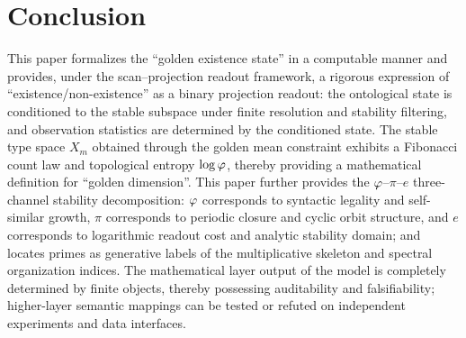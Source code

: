\section{Conclusion}

This paper formalizes the ``golden existence state'' in a computable manner and provides, under the scan--projection readout framework, a rigorous expression of ``existence/non-existence'' as a binary projection readout: the ontological state is conditioned to the stable subspace under finite resolution and stability filtering, and observation statistics are determined by the conditioned state. The stable type space $X_m$ obtained through the golden mean constraint exhibits a Fibonacci count law and topological entropy $\log\varphi$, thereby providing a mathematical definition for ``golden dimension''. This paper further provides the $\varphi$--$\pi$--$e$ three-channel stability decomposition: $\varphi$ corresponds to syntactic legality and self-similar growth, $\pi$ corresponds to periodic closure and cyclic orbit structure, and $e$ corresponds to logarithmic readout cost and analytic stability domain; and locates primes as generative labels of the multiplicative skeleton and spectral organization indices. The mathematical layer output of the model is completely determined by finite objects, thereby possessing auditability and falsifiability; higher-layer semantic mappings can be tested or refuted on independent experiments and data interfaces.
